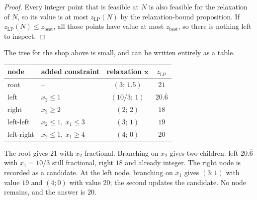 \begin{proof}
Every integer point that is feasible at $N$ is also feasible for the relaxation of $N$, so its
value is at most $z_{\mathrm{LP}}(N)$ by the relaxation-bound proposition. If
$z_{\mathrm{LP}}(N)\le z_{\mathrm{best}}$, all those points have value at most
$z_{\mathrm{best}}$, so there is nothing left to inspect.
\end{proof}

The tree for the shop above is small, and can be written entirely as a table.
\begin{center}
\begin{tabular}{llcc}
\hline
node & added constraint & relaxation $\mathbf{x}$ & $z_{\mathrm{LP}}$ \\
\hline
root & -- & $(3;\,1.5)$ & $21$ \\
left & $x_{2}\le1$ & $(10/3;\,1)$ & $20.\overline{6}$ \\
right & $x_{2}\ge2$ & $(2;\,2)$ & $18$ \\
left-left & $x_{2}\le1,\ x_{1}\le3$ & $(3;\,1)$ & $19$ \\
left-right & $x_{2}\le1,\ x_{1}\ge4$ & $(4;\,0)$ & $20$ \\
\hline
\end{tabular}
\end{center}
The root gives $21$ with $x_{2}$ fractional. Branching on $x_{2}$ gives two children: left
$20.\overline{6}$ with $x_{1}=10/3$ still fractional, right $18$ and already integer. The right
node is recorded as a candidate. At the left node, branching on $x_{1}$ gives $(3;1)$ with value
$19$ and $(4;0)$ with value $20$; the second updates the candidate. No node remains, and the
answer is $20$.

